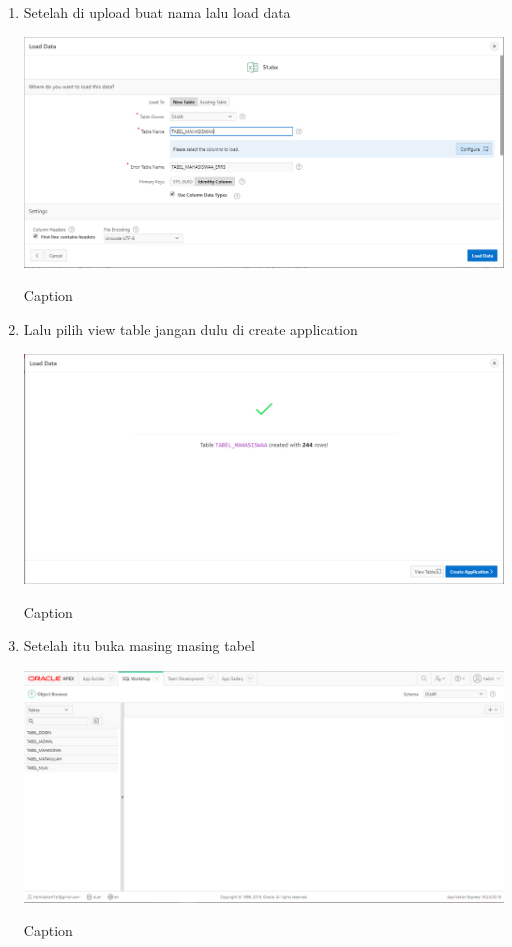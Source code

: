 ﻿\documentclass{article}
\begin{document}
\begin{enumerate}
    \item Setelah di upload buat nama lalu load data
    \begin{center}
        \centering
        \includegraphics[scale=0.4]{figures/8.PNG}
        \caption{Caption}
        \label{fig:my_label}
    \end{center}
    
        \item Lalu pilih view table jangan dulu di create application
    \begin{center}
        \centering
        \includegraphics[scale=0.4]{figures/9.PNG}
        \caption{Caption}
        \label{fig:my_label}
    \end{center}
    
        \item Setelah itu buka masing masing tabel 
    \begin{center}
        \centering
        \includegraphics[scale=0.4]{figures/7.PNG}
        \caption{Caption}
        \label{fig:my_label}
    \end{center}


\end{enumerate}
\end{document}
